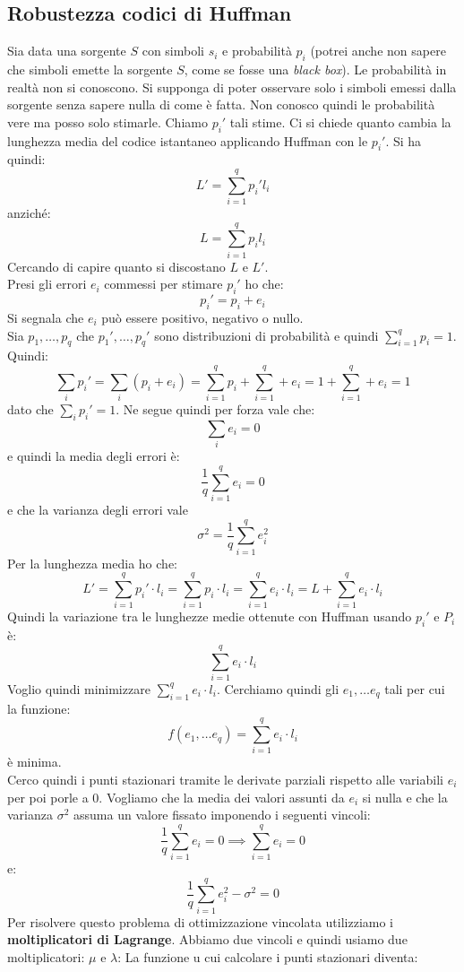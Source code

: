 \documentclass[a4paper,12pt, oneside]{book}
\begin{document}
\subsection{Robustezza codici di Huffman}
Sia data una sorgente $S$ con simboli $s_i$ e probabilità $p_i$ (potrei anche
non sapere che simboli emette la sorgente $S$, come se fosse una \textit{black
  box}). Le probabilità in realtà non si conoscono. Si supponga di 
poter osservare solo i simboli emessi dalla sorgente senza sapere nulla di come
è fatta. Non conosco quindi le probabilità vere ma posso solo stimarle. Chiamo
$p_i'$ tali stime. Ci si chiede quanto cambia la lunghezza media del codice
istantaneo applicando Huffman con le $p_i'$. Si ha quindi:
\[L'=\sum_{i=1}^q p_i'l_i\]
anziché:
\[L=\sum_{i=1}^q p_il_i\]
Cercando di capire quanto si discostano $L$ e $L'$.\\
Presi gli errori $e_i$ commessi per stimare $p_i'$ ho che:
\[p_i'=p_i+e_i\]
Si segnala che $e_i$ può essere positivo, negativo o nullo.\\
Sia $p_1,\ldots, p_q$ che $p_1',\ldots, p_q'$ sono distribuzioni di probabilità
e quindi $\sum_{i=1}^q p_i=1$.\\
Quindi:
\[\sum_ip_i'=\sum_i (p_i+e_i)=\sum_{i=1}^q p_i+\sum_{i=1}^q +e_i=1+\sum_{i=1}^q
  +e_i=1\] 
dato che $\sum_ip_i'=1$. Ne segue quindi per forza vale che:
\[\sum_i e_i=0\]
e quindi la media degli errori è:
\[\frac{1}{q}\sum_{i=1}^q e_i=0\]
e che la varianza degli errori vale
\[\sigma^2=\frac{1}{q}\sum_{i=1}^q e_i^2\]
Per la lunghezza media ho che:
\[L'=\sum_{i=1}^q p_i'\cdot l_i=\sum_{i=1}^q p_i\cdot l_i=\sum_{i=1}^q e_i\cdot
  l_i=L+\sum_{i=1}^q e_i\cdot l_i\]
Quindi la variazione tra le lunghezze medie ottenute con Huffman usando $p_i'$ e
$P_i$ è:
\[\sum_{i=1}^q e_i\cdot l_i\]
Voglio quindi minimizzare $\sum_{i=1}^q e_i\cdot l_i$. Cerchiamo quindi gli
$e_1,\ldots e_q$ tali per cui la funzione:
\[f(e_1,\ldots e_q)=\sum_{i=1}^q e_i\cdot l_i\]
è minima.\\
Cerco quindi i punti stazionari tramite le derivate parziali rispetto alle
variabili $e_i$ per poi porle a 0. Vogliamo che la media dei valori assunti da
$e_i$ si nulla e che la varianza $\sigma^2$ assuma un valore fissato imponendo i
seguenti vincoli:
\[\frac{1}{q}\sum_{i=1}^q e_i=0\implies \sum_{i=1}^q e_i=0\]
e:
\[\frac{1}{q}\sum_{i=1}^q e_i^2-\sigma^2 =0\]
Per risolvere questo problema di ottimizzazione vincolata utilizziamo i
\textbf{moltiplicatori di Lagrange}. Abbiamo due vincoli e quindi usiamo due
moltiplicatori: $\mu$ e $\lambda$:
La funzione u cui calcolare i punti stazionari diventa:
\end{document}
